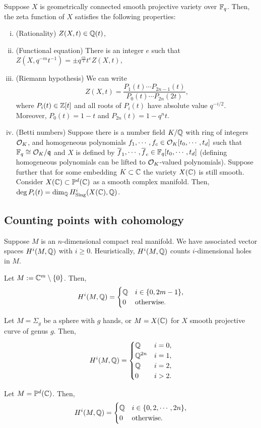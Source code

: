 \documentclass{../../../small}
\begin{document}
\begin{thm*}
Suppose $X$ is geometrically connected smooth projective variety over $\mathbb{F}_q$.
Then, the zeta function of $X$ satisfies the following properties:
\begin{enumerate}[(i)]
\item (Rationality) $Z(X,t)\in\mathbb{Q}(t)$,
\item (Functional equation) There is an integer $e$ such that $Z(X,q^{-m}t^{-1})=\pm q^{\frac{en}2}t^eZ(X,t)$,
\item (Riemann hypothesis) We can write
\[Z(X,t)=\frac{P_1(t)\cdots P_{2n-1}(t)}{P_0(t)\cdots P_{2n}(2t)},\]
where $P_i(t)\in\mathbb{Z}[t]$ and all roots of $P_i(t)$ have absolute value $q^{-i/2}$.
Moreover, $P_0(t)=1-t$ and $P_{2n}(t)=1-q^nt$.
\item (Betti numbers) Suppose there is a number field $K/\mathbb{Q}$ with ring of integers $\mathcal{O}_K$, and homogeneous polynomials $f_1,\cdots,f_c\in\mathcal{O}_K[t_0,\cdots,t_d]$ such that $\mathbb{F}_q\cong\mathcal{O}_K/\mathfrak{q}$ and $X$ is defined by $\overline f_1,\cdots,\overline f_c\in\mathbb{F}_q[t_0,\cdots,t_d]$ (defining homogeneous polynomials can be lifted to $\mathcal{O}_K$-valued polynomials).
Suppose further that for some embedding $K\subset\mathbb{C}$ the variety $X(\mathbb{C})$ is still smooth.
Consider $X(\mathbb{C})\subset\mathbb{P}^d(\mathbb{C})$ as a smooth complex manifold.
Then, $\deg P_i(t)=\dim_{\mathbb{Q}} H^i_{\mathrm{Sing}}(X(\mathbb{C}),\mathbb{Q})$.
\end{enumerate}
\end{thm*}


\subsection{Counting points with cohomology}
Suppose $M$ is an $n$-dimensional compact real manifold.
We have associated vector spaces $H^i(M,\mathbb{Q})$ with $i\ge0$.
Heuristically, $H^i(M,\mathbb{Q})$ counts $i$-dimensional holes in $M$.
\begin{ex*}
Let $M:=\mathbb{C}^m\setminus\{0\}$.
Then,
\[H^i(M,\mathbb{Q})=\begin{cases}
\mathbb{Q}&i\in\{0,2m-1\},\\
0&\text{otherwise}.	
\end{cases}\]
\end{ex*}
\begin{ex*}
Let $M=\Sigma_g$ be a sphere with $g$ hands, or $M=X(\mathbb{C})$ for $X$ smooth projective curve of genus $g$.
Then,
\[H^i(M,\mathbb{Q})=\begin{cases}
\mathbb{Q}&i=0,\\
\mathbb{Q}^{2n}&i=1,\\
\mathbb{Q}&i=2,\\
0&i>2.
\end{cases}\]
\end{ex*}
\begin{ex*}
Let $M=\mathbb{P}^d(\mathbb{C})$.
Then,
\[H^i(M,\mathbb{Q})=\begin{cases}
\mathbb{Q}&i\in\{0,2,\cdots,2n\},\\
0&\text{otherwise}.	
\end{cases}\]
\end{ex*}
\end{document}
